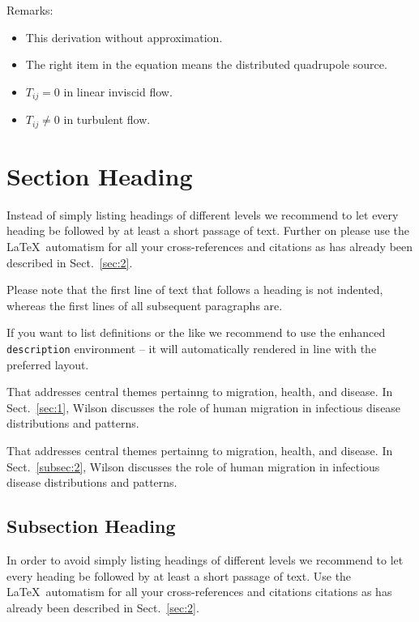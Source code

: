 \documentclass[graybox]{svmult}
\begin{document}
Remarks:
\begin{itemize}
    \item {This derivation without approximation.}
    \item {The right item in the equation means the distributed quadrupole source.}
    \item {$ T_{ij} = 0 $ in linear inviscid flow.}
    \item {$ T_{ij} \neq 0 $ in turbulent flow.}
\end{itemize}









\section{Section Heading}
\label{sec:3}
Instead of simply listing headings of different levels we recommend to let every heading be followed by at least a short passage of text.  Further on please use the \LaTeX\ automatism for all your cross-references and citations as has already been described in Sect.~\ref{sec:2}.

Please note that the first line of text that follows a heading is not indented, whereas the first lines of all subsequent paragraphs are.

If you want to list definitions or the like we recommend to use the enhanced \verb|description| environment -- it will automatically rendered in line with the preferred layout.

\begin{description}[Type 1]
\item[Type 1]{That addresses central themes pertainng to migration, health, and disease. In Sect.~\ref{sec:1}, Wilson discusses the role of human migration in infectious disease distributions and patterns.}
\item[Type 2]{That addresses central themes pertainng to migration, health, and disease. In Sect.~\ref{subsec:2}, Wilson discusses the role of human migration in infectious disease distributions and patterns.}
\end{description}

\subsection{Subsection Heading} %
In order to avoid simply listing headings of different levels we recommend to let every heading be followed by at least a short passage of text. Use the \LaTeX\ automatism for all your cross-references and citations citations as has already been described in Sect.~\ref{sec:2}.
\end{document}
